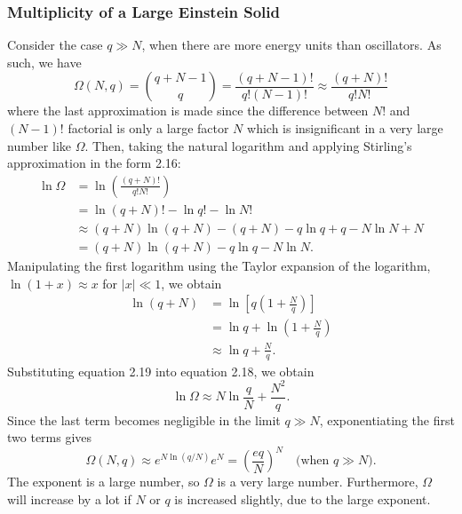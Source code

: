 \documentclass[11pt]{exam}
\begin{document}
\subsubsection*{Multiplicity of a Large Einstein Solid}
Consider the case $q\gg N$, when there are more energy units than oscillators. As such, we have 
\begin{equation}\tag{2.17}
\Omega(N, q)=\binom{q+N-1}{q} = \frac{(q+N-1)!}{q!(N-1)!}\approx \frac{(q+N)!}{q!N!}
\end{equation}
where the last approximation is made since the difference between $N!$ and $(N-1)!$ factorial is only a large factor $N$ which is insignificant in a very large number like $\Omega$. Then, taking the natural logarithm and applying Stirling's approximation in the form 2.16:
\begin{align*}
\ln{\Omega}&=\ln{\left(\frac{(q+N)!}{q!N!}\right)}\\
&= \ln{(q+N)!}-\ln{q!}-\ln{N!}\\
&\approx (q+N)\ln{(q+N)}-(q+N)-q\ln{q}+q-N\ln{N}+N\\
&= (q+N)\ln{(q+N)}-q\ln{q}-N\ln{N}. 
\end{align*}
Manipulating the first logarithm using the Taylor expansion of the logarithm, $\ln{(1+x)}\approx x$ for $|x|\ll 1$, we obtain 
\begin{align*}\tag{2.19}
\ln{(q+N)}&= \ln{\left[q\left(1+\frac{N}{q}\right)\right]}\\
&= \ln{q} + \ln{\left(1+\frac{N}{q}\right)}\\
&\approx \ln{q} +\frac{N}{q}.
\end{align*}
Substituting equation 2.19 into equation 2.18, we obtain 
\begin{equation}\tag{2.20}
\ln{\Omega} \approx N\ln{\frac{q}{N}}+\frac{N^2}{q}.   
\end{equation}
Since the last term becomes negligible in the limit $q\gg N$, exponentiating the first two terms gives 
\begin{equation}\tag{2.21}
\Omega(N, q)\approx e^{N\ln{(q/N)}}e^N=\left(\frac{eq}{N}\right)^N\quad\text{(when $q\gg N$).}  
\end{equation}
The exponent is a large number, so $\Omega$ is a very large number. Furthermore, $\Omega$ will increase by a lot if $N$ or $q$ is increased slightly, due to the large exponent. 
\newpage
\end{document}

